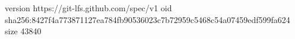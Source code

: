 version https://git-lfs.github.com/spec/v1
oid sha256:8427f4a773871127ea784fb90536023c7b72959c5468c54a07459edf599fa624
size 43840
